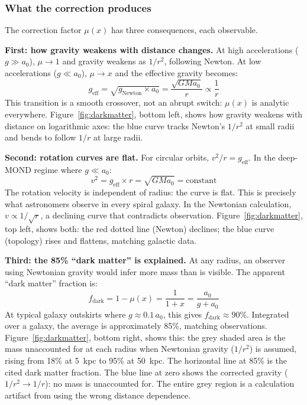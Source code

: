 \documentclass[aps,prd,preprint,superscriptaddress,showpacs,preprintnumbers,amsmath,amssymb,nofootinbib]{revtex4-2}
\begin{document}
\subsubsection*{What the correction produces}

The correction factor $\mu(x)$ has three consequences, each observable.

\textbf{First: how gravity weakens with distance changes.} At high accelerations ($g \gg a_0$), $\mu \to 1$ and gravity weakens as $1/r^2$, following Newton. At low accelerations ($g \ll a_0$), $\mu \to x$ and the effective gravity becomes:
\begin{equation}
g_{\text{eff}} = \sqrt{g_{\text{Newton}} \times a_0} = \frac{\sqrt{G M a_0}}{r} \propto \frac{1}{r}
\label{eq:deep-mond}
\end{equation}
This transition is a smooth crossover, not an abrupt switch: $\mu(x)$ is analytic everywhere. Figure~\ref{fig:darkmatter}, bottom left, shows how gravity weakens with distance on logarithmic axes: the blue curve tracks Newton's $1/r^2$ at small radii and bends to follow $1/r$ at large radii.

\textbf{Second: rotation curves are flat.} For circular orbits, $v^2/r = g_{\text{eff}}$. In the deep-MOND regime where $g \ll a_0$:
\begin{equation}
v^2 = g_{\text{eff}} \times r = \sqrt{G M a_0} = \text{constant}
\label{eq:flat-rotation}
\end{equation}
The rotation velocity is independent of radius: the curve is flat. This is precisely what astronomers observe in every spiral galaxy. In the Newtonian calculation, $v \propto 1/\sqrt{r}$, a declining curve that contradicts observation. Figure~\ref{fig:darkmatter}, top left, shows both: the red dotted line (Newton) declines; the blue curve (topology) rises and flattens, matching galactic data.

\textbf{Third: the 85\% ``dark matter'' is explained.} At any radius, an observer using Newtonian gravity would infer more mass than is visible. The apparent ``dark matter'' fraction is:
\begin{equation}
f_{\text{dark}} = 1 - \mu(x) = \frac{1}{1 + x} = \frac{a_0}{g + a_0}
\label{eq:dark-fraction}
\end{equation}
At typical galaxy outskirts where $g \approx 0.1 \, a_0$, this gives $f_{\text{dark}} \approx 90\%$. Integrated over a galaxy, the average is approximately 85\%, matching observations. Figure~\ref{fig:darkmatter}, bottom right, shows this: the grey shaded area is the mass unaccounted for at each radius when Newtonian gravity ($1/r^2$) is assumed, rising from 18\% at 5~kpc to 95\% at 50~kpc. The horizontal line at 85\% is the cited dark matter fraction. The blue line at zero shows the corrected gravity ($1/r^2 \to 1/r$): no mass is unaccounted for. The entire grey region is a calculation artifact from using the wrong distance dependence.
\end{document}
